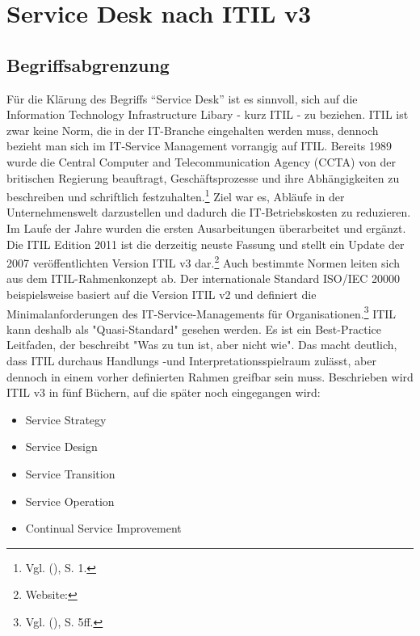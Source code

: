 \section{Service Desk nach ITIL v3}

\subsection{Begriffsabgrenzung}

\noindent Für die Klärung des Begriffs \enquote{Service Desk} ist es sinnvoll, sich auf die Information Technology Infrastructure Libary - kurz ITIL - zu beziehen.
ITIL ist zwar keine Norm, die in der IT-Branche eingehalten werden muss, dennoch bezieht man sich im IT-Service Management vorrangig auf ITIL.
Bereits 1989 wurde die Central Computer and Telecommunication Agency (CCTA) von der britischen Regierung beauftragt, Geschäftsprozesse und ihre Abhängigkeiten zu beschreiben und schriftlich festzuhalten.\footnote{Vgl. \citeauthor{Olbrich} (\citeyear{Olbrich}), S. 1.}
Ziel war es, Abläufe in der Unternehmenswelt darzustellen und dadurch die IT-Betriebskosten zu reduzieren. Im Laufe der Jahre wurden die ersten Ausarbeitungen überarbeitet und ergänzt. Die ITIL Edition 2011 ist die derzeitig neuste Fassung und stellt ein Update der 2007 veröffentlichten Version ITIL v3 dar.\footnote{Website:\cite{Andenmatten}}
Auch bestimmte Normen leiten sich aus dem ITIL-Rahmenkonzept ab. Der internationale Standard ISO/IEC 20000 beispielsweise basiert auf die Version ITIL v2 und definiert die Minimalanforderungen des IT-Service-Managements für Organisationen.\footnote{Vgl. \citeauthor{Buchsein} (\citeyear{Buchsein}), S. 5ff.}
ITIL kann deshalb als "Quasi-Standard" gesehen werden. Es ist ein  Best-Practice Leitfaden, der beschreibt "Was zu tun ist, aber nicht wie". Das macht deutlich, dass ITIL durchaus Handlungs -und Interpretationsspielraum zulässt, aber dennoch in einem vorher definierten Rahmen greifbar sein muss. Beschrieben wird ITIL v3 in fünf Büchern, auf die später noch eingegangen wird:

\begin{itemize}
\item Service Strategy
\item Service Design
\item Service Transition
\item Service Operation
\item Continual Service Improvement
\end{itemize}

